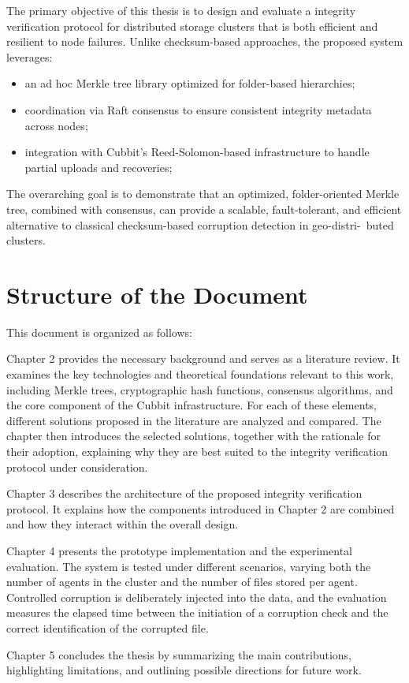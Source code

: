 The primary objective of this thesis is to design and evaluate a integrity verification protocol for distributed storage clusters that is both efficient and resilient to node failures. Unlike checksum-based approaches, the proposed system leverages:  
\begin{itemize}
    \item an ad hoc Merkle tree library optimized for folder-based hierarchies;  
    \item coordination via Raft consensus to ensure consistent integrity
        metadata across nodes;  
    \item integration with Cubbit's Reed-Solomon-based infrastructure to handle partial uploads and recoveries;  
\end{itemize}

The overarching goal is to demonstrate that an optimized, folder-oriented Merkle
tree, combined with consensus, can provide a scalable, fault-tolerant, and
efficient alternative to classical checksum-based corruption detection in
geo-distri-\ buted clusters.


\section{Structure of the Document}

This document is organized as follows:

Chapter 2 provides the necessary background and serves as a literature review. It examines the key technologies and theoretical foundations relevant to this work, including Merkle trees, cryptographic hash functions, consensus algorithms, and the core component of the Cubbit infrastructure. For each of these elements, different solutions proposed in the literature are analyzed and compared. The chapter then introduces the selected solutions, together with the rationale for their adoption, explaining why they are best suited to the integrity verification protocol under consideration.
    
Chapter 3 describes the architecture of the proposed integrity verification protocol. It explains how the components introduced in Chapter 2 are combined and how they interact within the overall design.

Chapter 4 presents the prototype implementation and the experimental evaluation. The system is tested under different scenarios, varying both the number of agents in the cluster and the number of files stored per agent. Controlled corruption is deliberately injected into the data, and the evaluation measures the elapsed time between the initiation of a corruption check and the correct identification of the corrupted file.

Chapter 5 concludes the thesis by summarizing the main contributions, highlighting limitations, and outlining possible directions for future work.
